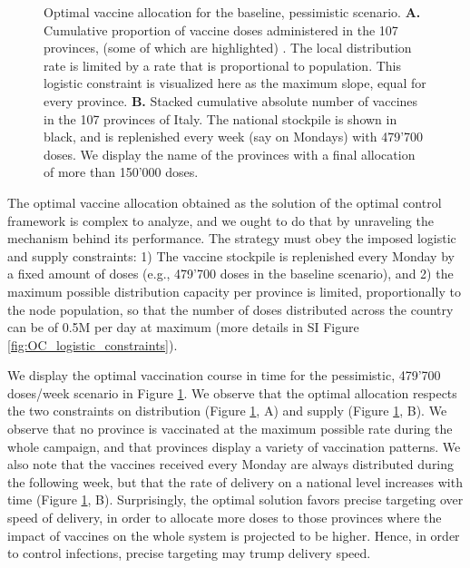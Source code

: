 \begin{figure}[!ht]
    \caption[Optimal vaccine allocation for the baseline, pessimistic scenario. ]{Optimal vaccine allocation for the baseline, pessimistic scenario. \textbf{A.} Cumulative proportion of vaccine doses administered in the 107 provinces, (some of which are highlighted) . The local distribution rate is limited by a rate that is proportional to population. This logistic constraint is visualized here as the maximum slope, equal for every province.
    \textbf{B.} Stacked cumulative absolute number of vaccines in the 107 provinces of Italy. The national stockpile is shown in black, and is replenished every week (say on Mondays) with 479'700 doses. We display the name of the provinces with a final allocation of more than 150'000 doses.}
    \label{fig:OC_stackplot}
\end{figure}

The optimal vaccine allocation obtained as the solution of the optimal control framework is complex to analyze, and we ought to do that by unraveling the mechanism behind its performance.
The strategy must obey the imposed logistic and supply constraints: 1) The vaccine stockpile is replenished every Monday by a fixed amount of doses (e.g., 479'700 doses in the baseline scenario), and 2) the maximum possible distribution capacity per province is limited, proportionally to the node population, so that the number of doses distributed across the country can be of 0.5M per day at maximum (more details in SI Figure \ref{fig:OC_logistic_constraints}). 

We display the optimal vaccination course in time for the pessimistic, 479'700 doses/week scenario in Figure \ref{fig:OC_stackplot}. We observe that the optimal allocation respects the two constraints on distribution (Figure \ref{fig:OC_stackplot}, A) and supply (Figure \ref{fig:OC_stackplot}, B). We observe that no province is vaccinated at the maximum possible rate during the whole campaign, and that provinces display a variety of vaccination patterns. We also note that the vaccines received every Monday are always distributed during the following week, but that the rate of delivery on a national level increases with time (Figure \ref{fig:OC_stackplot}, B). Surprisingly, the optimal solution favors precise targeting over speed of delivery, in order to allocate more doses to those provinces where the impact of vaccines on the whole system is projected to be higher. Hence, in order to control infections, precise targeting may trump delivery speed. 

